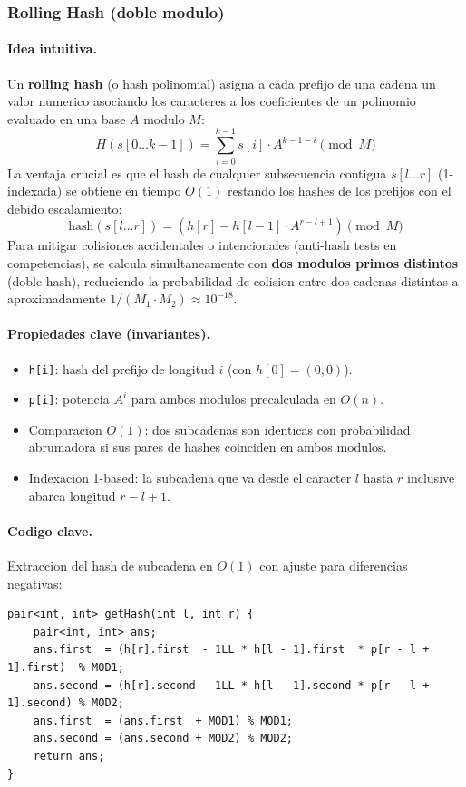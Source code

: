 \subsubsection{Rolling Hash (doble modulo)}

\paragraph{Idea intuitiva.}
Un \textbf{rolling hash} (o hash polinomial) asigna a cada prefijo de una cadena un valor numerico asociando los caracteres a los coeficientes de un polinomio evaluado en una base $A$ modulo $M$:
\[
H(s[0 \dots k-1]) = \sum_{i=0}^{k-1} s[i] \cdot A^{k-1-i} \pmod M
\]
La ventaja crucial es que el hash de cualquier subsecuencia contigua $s[l \dots r]$ (1-indexada) se obtiene en tiempo $O(1)$ restando los hashes de los prefijos con el debido escalamiento:
\[
\text{hash}(s[l \dots r]) = \left( h[r] - h[l-1] \cdot A^{r-l+1} \right) \pmod M
\]
Para mitigar colisiones accidentales o intencionales (anti-hash tests en competencias), se calcula simultaneamente con \textbf{dos modulos primos distintos} (doble hash), reduciendo la probabilidad de colision entre dos cadenas distintas a aproximadamente $1 / (M_1 \cdot M_2) \approx 10^{-18}$.

\paragraph{Propiedades clave (invariantes).}
\begin{itemize}\setlength\itemsep{0pt}
	\item \texttt{h[i]}: hash del prefijo de longitud $i$ (con $h[0] = (0, 0)$).
	\item \texttt{p[i]}: potencia $A^i$ para ambos modulos precalculada en $O(n)$.
	\item Comparacion $O(1)$: dos subcadenas son identicas con probabilidad abrumadora si sus pares de hashes coinciden en ambos modulos.
	\item Indexacion 1-based: la subcadena que va desde el caracter $l$ hasta $r$ inclusive abarca longitud $r - l + 1$.
\end{itemize}

\paragraph{Codigo clave.}
Extraccion del hash de subcadena en $O(1)$ con ajuste para diferencias negativas:
\begin{verbatim}
pair<int, int> getHash(int l, int r) {
    pair<int, int> ans;
    ans.first  = (h[r].first  - 1LL * h[l - 1].first  * p[r - l + 1].first)  % MOD1;
    ans.second = (h[r].second - 1LL * h[l - 1].second * p[r - l + 1].second) % MOD2;
    ans.first  = (ans.first  + MOD1) % MOD1;
    ans.second = (ans.second + MOD2) % MOD2;
    return ans;
}
\end{verbatim}

